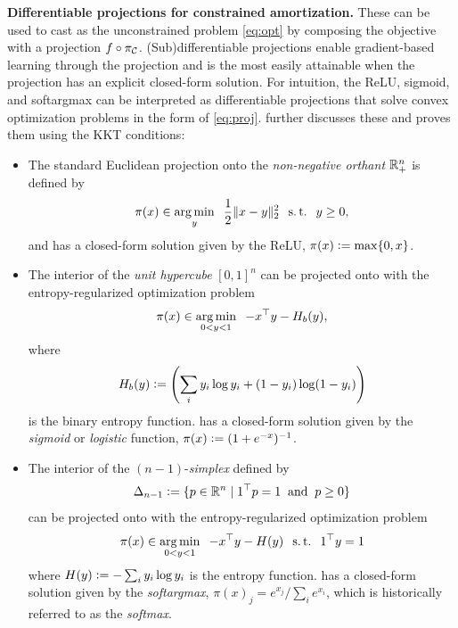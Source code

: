 \textbf{Differentiable projections for constrained amortization.}
These can be used to cast  as the unconstrained
problem \cref{eq:opt} by composing the objective with a projection
$f\circ \pi_{\mathcal{C}}$.
(Sub)differentiable projections enable gradient-based learning through the projection
and is the most easily attainable when the projection has an explicit closed-form solution.
For intuition, the ReLU, sigmoid, and softargmax can be interpreted as
differentiable projections that solve convex optimization problems
in the form of \cref{eq:proj}.
\citet[\S2.4.4]{amos2019differentiable} further discusses these
and proves them using the KKT conditions:
\begin{itemize}
\item The standard Euclidean projection onto the
  \emph{non-negative orthant} $\mathbb{R}^n_+$ is defined by
  \begin{equation}
    \pi(x) \in \operatorname*{arg\,min}_y \;\; \frac{1}{2}\|x-y\|_2^2 \;\; \operatorname*{s.t.} \;\; y\geq 0,
    \label{eq:relu-proj}
  \end{equation}
  and has a closed-form solution given by the
  ReLU, \ie $\pi(x) \vcentcolon= \max\{0, x\}$.
\item The interior of the \emph{unit hypercube} $[0,1]^n$ can
  be projected onto with the entropy-regularized
  optimization problem
  \begin{equation}
    \pi(x) \in \operatorname*{arg\,min}_{0<y<1} \;\; -x^\top y -H_b(y),
    \label{eq:sigmoid-proj}
  \end{equation}
  where
  \begin{equation}
  H_b(y) \vcentcolon= \left(\sum_i y_i\log y_i + (1-y_i)\log (1-y_i)\right)
  \end{equation}
  is the
  binary entropy function.
   has a closed-form solution given by
  the \emph{sigmoid} or \emph{logistic} function,
  \ie $\pi(x) \vcentcolon= (1+e^{-x})^{-1}$.
\item The interior of the $(n-1)$-\emph{simplex} defined by
  \begin{equation}
    \Delta_{n-1}\vcentcolon=\{p\in\mathbb{R}^n\; \vert\; 1^\top p = 1 \; \; {\rm and} \;\; p \geq 0 \}
    \label{eq:simplex}
  \end{equation}
  can be projected onto with the entropy-regularized
  optimization problem
  \begin{equation}
    \pi(x) \in \operatorname*{arg\,min}_{0<y<1} \;\; -x^\top y - H(y) \;\; \operatorname*{s.t.}\;\; 1^\top y = 1
    \label{eq:simplex-proj}
  \end{equation}
  where $H(y) \vcentcolon= -\sum_i y_i \log y_i$ is the entropy function.
   has a closed-form solution given by
  the \emph{softargmax}, \ie $\pi(x)_j = e^{x_j} / \sum_i e^{x_i}$,
  which is historically referred to as the \emph{softmax}.
\end{itemize}

